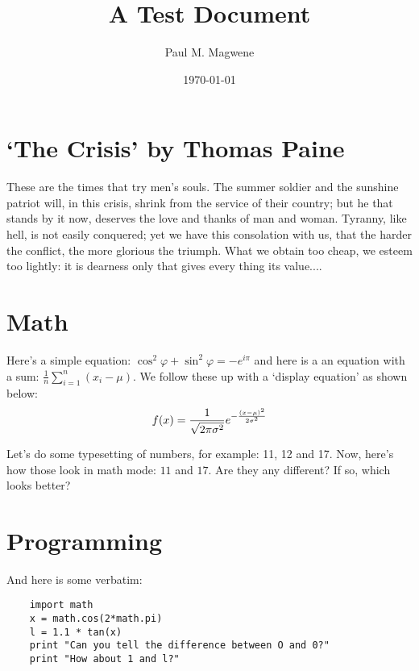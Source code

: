 
\newcommand{\normdistn}{\ensuremath{%
f(x) = 
\frac{1}{\sqrt{2\pi\sigma^2}} e^{-\frac{(x-\mu)^2}{2\sigma^2}}
}}

\newcommand{\varx}{\ensuremath{\frac{1}{n}\sum_{i=1}^{n}(x_i-\mu)}}


\title{\LARGE A Test Document}
\author{\large Paul M. Magwene}
\date{\large\today}


\maketitle
    
\section{`The Crisis' by Thomas Paine}

These are the times that try men's souls. The summer soldier and the sunshine patriot will, in this crisis, shrink from the service of their country; but he that stands by it now, deserves the love and thanks of man and woman. Tyranny, like hell, is not easily conquered; yet we have this consolation with us, that the harder the conflict, the more glorious the triumph. What we obtain too cheap, we esteem too lightly: it is dearness only that gives every thing its value....


\section{Math}

Here's a simple equation: $\cos^2 \varphi + \sin^2 \varphi = -e^{i\pi}$ and here is a an equation with a sum: \varx. We follow these up with a `display equation' as shown below:
\[
\normdistn
\]

Let's do some typesetting of numbers, for example: 11, 12 and 17. Now, here's how those look in math mode: $11$ and $17$. Are they any different? If so, which looks better?

\section{Programming}

And here is some verbatim:
\begin{verbatim}
    import math
    x = math.cos(2*math.pi)
    l = 1.1 * tan(x)
    print "Can you tell the difference between O and 0?"
    print "How about 1 and l?"
\end{verbatim}  

